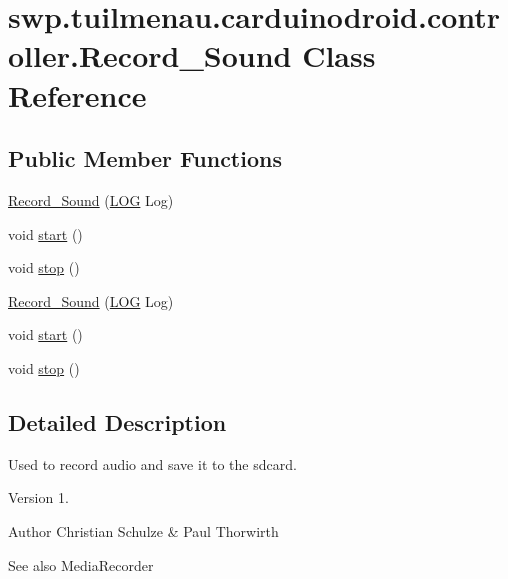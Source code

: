 \hypertarget{classswp_1_1tuilmenau_1_1carduinodroid_1_1controller_1_1_record___sound}{}\section{swp.\+tuilmenau.\+carduinodroid.\+controller.\+Record\+\_\+\+Sound Class Reference}
\label{classswp_1_1tuilmenau_1_1carduinodroid_1_1controller_1_1_record___sound}
\subsection*{Public Member Functions}
\begin{DoxyCompactItemize}
\item 
\hyperlink{classswp_1_1tuilmenau_1_1carduinodroid_1_1controller_1_1_record___sound_a16a63aa659f4b3263a56850f272597bb}{Record\+\_\+\+Sound} (\hyperlink{classswp_1_1tuilmenau_1_1carduinodroid_1_1model_1_1_l_o_g}{L\+O\+G} Log)
\item 
void \hyperlink{classswp_1_1tuilmenau_1_1carduinodroid_1_1controller_1_1_record___sound_aab8cc754dfbdba7238f09c28cdb561eb}{start} ()
\item 
void \hyperlink{classswp_1_1tuilmenau_1_1carduinodroid_1_1controller_1_1_record___sound_a95cf9a4340f3ca211e2a8dd60f761dcf}{stop} ()
\item 
\hyperlink{classswp_1_1tuilmenau_1_1carduinodroid_1_1controller_1_1_record___sound_a16a63aa659f4b3263a56850f272597bb}{Record\+\_\+\+Sound} (\hyperlink{classswp_1_1tuilmenau_1_1carduinodroid_1_1model_1_1_l_o_g}{L\+O\+G} Log)
\item 
void \hyperlink{classswp_1_1tuilmenau_1_1carduinodroid_1_1controller_1_1_record___sound_aab8cc754dfbdba7238f09c28cdb561eb}{start} ()
\item 
void \hyperlink{classswp_1_1tuilmenau_1_1carduinodroid_1_1controller_1_1_record___sound_a95cf9a4340f3ca211e2a8dd60f761dcf}{stop} ()
\end{DoxyCompactItemize}


\subsection{Detailed Description}
Used to record audio and save it to the sdcard.

\begin{DoxyVersion}{Version}
1. 
\end{DoxyVersion}
\begin{DoxyAuthor}{Author}
Christian Schulze \& Paul Thorwirth 
\end{DoxyAuthor}
\begin{DoxySeeAlso}{See also}
Media\+Recorder 
\end{DoxySeeAlso}


